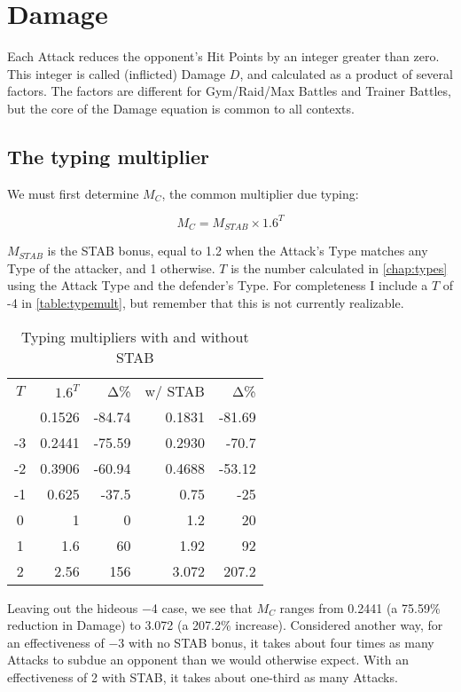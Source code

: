 \chapter{Damage}
\label{chap:damage}
Each Attack reduces the opponent's Hit Points by an integer greater than zero.
This integer is called (inflicted) Damage $D$, and calculated as a product of several factors.
The factors are different for Gym/Raid/Max Battles and Trainer Battles,
 but the core of the Damage equation is common to all contexts.

\section{The typing multiplier}
We must first determine $M_C$, the common multiplier due typing:

\[ M_C = M_{STAB} \times 1.6^{T} \]

$M_{STAB}$ is the STAB bonus, equal to 1.2 when the Attack's Type matches any
  Type of the attacker, and 1 otherwise.
$T$ is the number calculated in \autoref{chap:types} using the Attack Type
 and the defender's Type.
For completeness I include a $T$ of -4 in \autoref{table:typemult},
 but remember that this is not currently realizable.

\begin{table}
\begin{center}
\begin{tabular}{c r r r r}
  $T$ & $1.6^{T}$ & Δ\% & w/ STAB & Δ\% \\
\Midrule
  -4 & 0.1526 & -84.74 & 0.1831 & -81.69 \\
  -3 & 0.2441 & -75.59 & 0.2930 & -70.7 \\
  -2 & 0.3906 & -60.94 & 0.4688 & -53.12 \\
  -1 & 0.625 & -37.5 & 0.75 & -25 \\
  0 & 1 & 0 & 1.2 & 20 \\
  1 & 1.6 & 60 & 1.92 & 92 \\
  2 & 2.56 & 156 & 3.072 & 207.2 \\
\end{tabular}
\caption{Typing multipliers with and without STAB}
\label{table:typemult}
\end{center}
\end{table}

Leaving out the hideous −4 case, we see that $M_C$ ranges
 from 0.2441 (a 75.59\% reduction in Damage) to 3.072
 (a 207.2\% increase).
Considered another way, for an effectiveness of −3 with no STAB bonus,
 it takes about four times as many Attacks to subdue an opponent than
 we would otherwise expect.
With an effectiveness of 2 with STAB, it takes about one-third as many Attacks.

